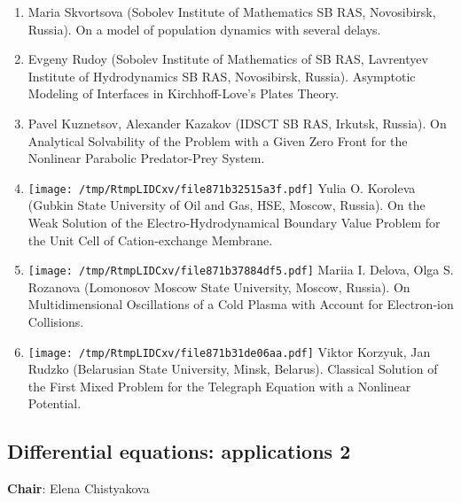 \documentclass[
]{article}
\providecommand{\tightlist}{%
  \setlength{\itemsep}{0pt}\setlength{\parskip}{0pt}}
\begin{document}
\begin{enumerate}
\def\labelenumi{\arabic{enumi}.}
\tightlist
\item
  Maria Skvortsova (Sobolev Institute of Mathematics SB RAS,
  Novosibirsk, Russia). On a model of population dynamics with several
  delays.
\item
  Evgeny Rudoy (Sobolev Institute of Mathematics of SB RAS, Lavrentyev
  Institute of Hydrodynamics SB RAS, Novosibirsk, Russia). Asymptotic
  Modeling of Interfaces in Kirchhoff-Love's Plates Theory.
\item
  Pavel Kuznetsov, Alexander Kazakov (IDSCT SB RAS, Irkutsk, Russia). On
  Analytical Solvability of the Problem with a Given Zero Front for the
  Nonlinear Parabolic Predator-Prey System.
\item
  \protect\texttt{[image: /tmp/RtmpLIDCxv/file871b32515a3f.pdf]}
  Yulia O. Koroleva (Gubkin State University of Oil and Gas, HSE,
  Moscow, Russia). On the Weak Solution of the Electro-Hydrodynamical
  Boundary Value Problem for the Unit Cell of Cation-exchange Membrane.
\item
  \protect\texttt{[image: /tmp/RtmpLIDCxv/file871b37884df5.pdf]}
  Mariia I. Delova, Olga S. Rozanova (Lomonosov Moscow State University,
  Moscow, Russia). On Multidimensional Oscillations of a Cold Plasma
  with Account for Electron-ion Collisions.
\item
  \protect\texttt{[image: /tmp/RtmpLIDCxv/file871b31de06aa.pdf]}
  Viktor Korzyuk, Jan Rudzko (Belarusian State University, Minsk,
  Belarus). Classical Solution of the First Mixed Problem for the
  Telegraph Equation with a Nonlinear Potential.
\end{enumerate}

\hypertarget{dea2}{%
\subsection{Differential equations: applications 2}\label{dea2}}

\textbf{Chair}: Elena Chistyakova
\end{document}
